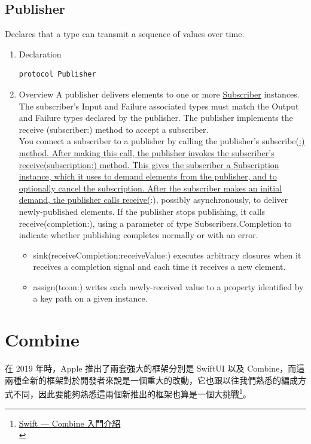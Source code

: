\documentclass[a4paper,12pt]{article}
\begin{document}
\subsection{Publisher}
\label{sec:org0e127f2}
Declares that a type can transmit a sequence of values over time.\\
\begin{enumerate}
\item Declaration
\label{sec:orgb4bcc83}
\lstset{breaklines=true,language=swift,label= ,caption= ,captionpos=b,firstnumber=1,numbers=left}
\begin{lstlisting}
protocol Publisher
\end{lstlisting}
\item Overview
\label{sec:orgcb14dd8}
A publisher delivers elements to one or more \href{https://developer.apple.com/documentation/combine/subscriber}{Subscriber} instances. The subscriber’s Input and Failure associated types must match the Output and Failure types declared by the publisher. The publisher implements the receive (subscriber:) method to accept a subscriber.\\
You connect a subscriber to a publisher by calling the publisher’s subscribe(\uline{:) method. After making this call, the publisher invokes the subscriber’s receive(subscription:) method. This gives the subscriber a Subscription instance, which it uses to demand elements from the publisher, and to optionally cancel the subscription. After the subscriber makes an initial demand, the publisher calls receive(}:), possibly asynchronously, to deliver newly-published elements. If the publisher stops publishing, it calls receive(completion:), using a parameter of type Subscribers.Completion to indicate whether publishing completes normally or with an error.\\

\begin{itemize}
\item sink(receiveCompletion:receiveValue:) executes arbitrary closures when it receives a completion signal and each time it receives a new element.\\
\item assign(to:on:) writes each newly-received value to a property identified by a key path on a given instance.\\
\end{itemize}
\end{enumerate}

\section{Combine}
\label{sec:orgfc99d10}
在 2019 年時，Apple 推出了兩套強大的框架分別是 SwiftUI 以及 Combine，而這兩種全新的框架對於開發者來說是一個重大的改動，它也跟以往我們熟悉的編成方式不同，因此要能夠熟悉這兩個新推出的框架也算是一個大挑戰\footnote{\href{https://medium.com/jeremy-xue-s-blog/swift-combine-\%E5\%85\%A5\%E9\%96\%80\%E4\%BB\%8B\%E7\%B4\%B9-333623e21d3d}{Swift — Combine 入門介紹}\\\label{orgd5285ef}}。\\
\end{document}
